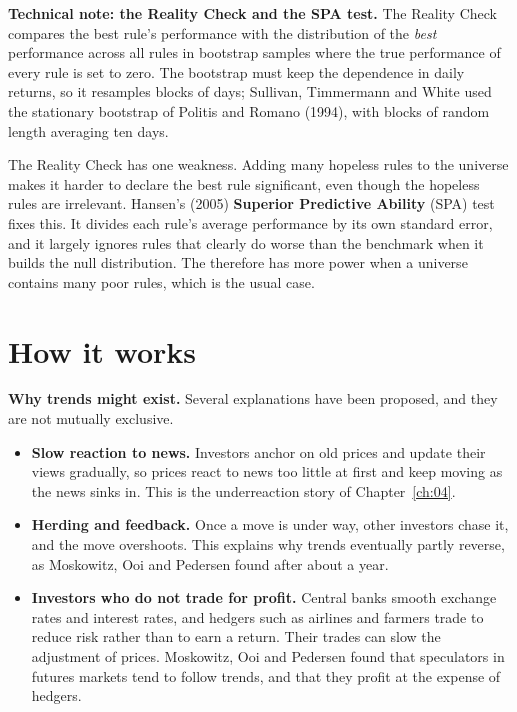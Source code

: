 \begin{technote}
\textbf{Technical note: the Reality Check and the SPA test.} The Reality Check compares the best rule's performance with the distribution of the \emph{best} performance across all rules in bootstrap samples where the true performance of every rule is set to zero. The bootstrap must keep the dependence in daily returns, so it resamples blocks of days; Sullivan, Timmermann and White used the stationary bootstrap of Politis and Romano (1994), with blocks of random length averaging ten days.

The Reality Check has one weakness. Adding many hopeless rules to the universe makes it harder to declare the best rule significant, even though the hopeless rules are irrelevant. Hansen's (2005) \textbf{Superior Predictive Ability} (SPA) test fixes this. It divides each rule's average performance by its own standard error, and it largely ignores rules that clearly do worse than the benchmark when it builds the null distribution. The  therefore has more power when a universe contains many poor rules, which is the usual case.
\end{technote}


\section{How it works}
\label{sec:08-how}

\textbf{Why trends might exist.} Several explanations have been proposed, and they are not mutually exclusive.

\begin{itemize}
  \item \textbf{Slow reaction to news.} Investors anchor on old prices and update their views gradually, so prices react to news too little at first and keep moving as the news sinks in. This is the underreaction story of Chapter~\ref{ch:04}.
  \item \textbf{Herding and feedback.} Once a move is under way, other investors chase it, and the move overshoots. This explains why trends eventually partly reverse, as Moskowitz, Ooi and Pedersen found after about a year.
  \item \textbf{Investors who do not trade for profit.} Central banks smooth exchange rates and interest rates, and hedgers such as airlines and farmers trade to reduce risk rather than to earn a return. Their trades can slow the adjustment of prices. Moskowitz, Ooi and Pedersen found that speculators in futures markets tend to follow trends, and that they profit at the expense of hedgers.
\end{itemize}

